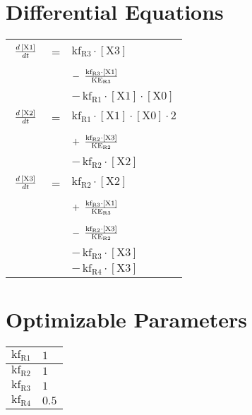 \documentclass{article}
\begin{document}
\section*{Differential Equations}
\providecommand{\tabfrac}[2]{%
   \setlength{\fboxrule}{0pt}%
   \fbox{$\frac{#1}{#2}$}}
\begin{longtable}{lll}
$ \tabfrac{d\,\left[\mathrm{X1}\right]}{dt} $ &=& $ \mathrm{kf_{R3}} \cdot \left[\mathrm{X3}\right] $\\
 & & $ - \, \tabfrac{\mathrm{kf_{R3}} \cdot \left[\mathrm{X1}\right]}{\mathrm{KE_{R3}}} $\\
 & & $ - \, \mathrm{kf_{R1}} \cdot \left[\mathrm{X1}\right] \cdot \left[\mathrm{X0}\right] $\\[5mm]
$ \tabfrac{d\,\left[\mathrm{X2}\right]}{dt} $ &=& $ \mathrm{kf_{R1}} \cdot \left[\mathrm{X1}\right] \cdot \left[\mathrm{X0}\right] \cdot 2 $\\
 & & $ + \, \tabfrac{\mathrm{kf_{R2}} \cdot \left[\mathrm{X3}\right]}{\mathrm{KE_{R2}}} $\\
 & & $ - \, \mathrm{kf_{R2}} \cdot \left[\mathrm{X2}\right] $\\[5mm]
$ \tabfrac{d\,\left[\mathrm{X3}\right]}{dt} $ &=& $ \mathrm{kf_{R2}} \cdot \left[\mathrm{X2}\right] $\\
 & & $ + \, \tabfrac{\mathrm{kf_{R3}} \cdot \left[\mathrm{X1}\right]}{\mathrm{KE_{R3}}} $\\
 & & $ - \, \tabfrac{\mathrm{kf_{R2}} \cdot \left[\mathrm{X3}\right]}{\mathrm{KE_{R2}}} $\\
 & & $ - \, \mathrm{kf_{R3}} \cdot \left[\mathrm{X3}\right] $\\
 & & $ - \, \mathrm{kf_{R4}} \cdot \left[\mathrm{X3}\right] $\\[5mm]
\end{longtable}
\section*{Optimizable Parameters}
\begin{longtable}{|r|l|}
\hline
$\mathrm{kf_{R1}}$& $1$\\
\hline
$\mathrm{kf_{R2}}$& $1$\\
\hline
$\mathrm{kf_{R3}}$& $1$\\
\hline
$\mathrm{kf_{R4}}$& $0.5$\\
\hline
\end{longtable}
\end{document}
